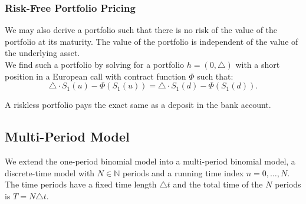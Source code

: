 \subsubsection{Risk-Free Portfolio Pricing}
We may also derive a portfolio such that there is no risk of the value of the
portfolio at its maturity. The value of the portfolio is independent of the
value of the underlying asset.\\
We find such a portfolio by solving for a portfolio $h=(0,\triangle)$ with a
short position in a European call with contract function $\Phi$ such that:
\[\triangle\cdot S_1(u)-\Phi(S_1(u))=\triangle\cdot S_1(d)-\Phi(S_1(d)).\]
\begin{remark}
  A riskless portfolio pays the exact same as a deposit in the bank account.
\end{remark}

\subsection{Multi-Period Model}
We extend the one-period binomial model into a multi-period binomial model, a
discrete-time model with $N \in \mathbb{N}$ periods and a running time index
$n=0,\ldots,N$. The time periods have a fixed time length $\triangle t$ and the
total time of the $N$ periods is $T=N\triangle t$.
